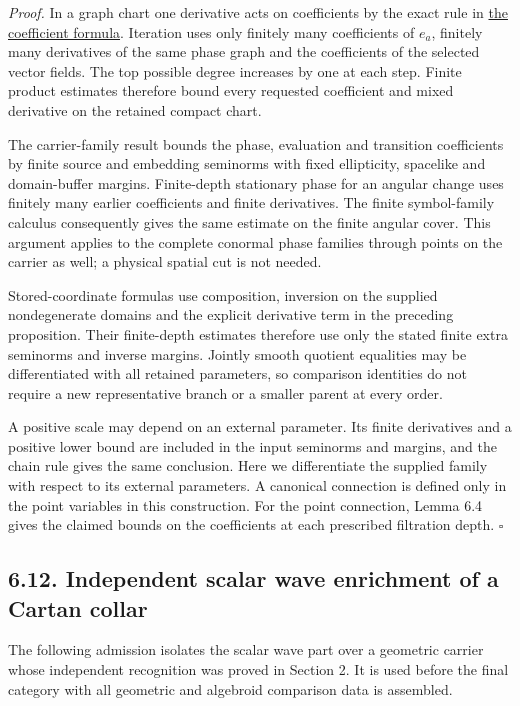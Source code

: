 \documentclass[
  english,
  11pt,
  reqno]{amsart}
\begin{document}
\emph{Proof.} In a graph chart one derivative acts on coefficients by
the exact rule in
\hyperref[eq:online-ambient-point-coefficient-derivative]{the
coefficient formula}. Iteration uses only finitely many coefficients of
\(e_a\), finitely many derivatives of the same phase graph and the
coefficients of the selected vector fields. The top possible degree
increases by one at each step. Finite product estimates therefore bound
every requested coefficient and mixed derivative on the retained compact
chart.

The carrier-family result bounds the phase, evaluation and transition
coefficients by finite source and embedding seminorms with fixed
ellipticity, spacelike and domain-buffer margins. Finite-depth
stationary phase for an angular change uses finitely many earlier
coefficients and finite derivatives. The finite symbol-family calculus
consequently gives the same estimate on the finite angular cover. This
argument applies to the complete conormal phase families through points
on the carrier as well; a physical spatial cut is not needed.

Stored-coordinate formulas use composition, inversion on the supplied
nondegenerate domains and the explicit derivative term in the preceding
proposition. Their finite-depth estimates therefore use only the stated
finite extra seminorms and inverse margins. Jointly smooth quotient
equalities may be differentiated with all retained parameters, so
comparison identities do not require a new representative branch or a
smaller parent at every order.

A positive scale may depend on an external parameter. Its finite
derivatives and a positive lower bound are included in the input
seminorms and margins, and the chain rule gives the same conclusion.
Here we differentiate the supplied family with respect to its external
parameters. A canonical connection is defined only in the point
variables in this construction. For the point connection, Lemma 6.4
gives the claimed bounds on the coefficients at each prescribed
filtration depth. \hfill\(\square\)

\subsection{6.12. Independent scalar wave enrichment of a Cartan
collar}\label{independent-scalar-wave-enrichment-of-a-cartan-collar}\label{sec:online-independent-wave-enrichment}

The following admission isolates the scalar wave part over a geometric
carrier whose independent recognition was proved in Section 2. It is
used before the final category with all geometric and algebroid
comparison data is assembled.
\end{document}
